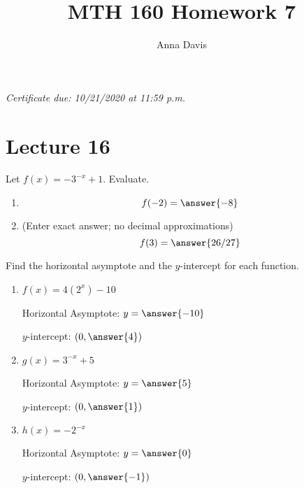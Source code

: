 \documentclass{ximera}
\author{Anna Davis} \title{MTH 160 Homework 7}
\begin{document}
\begin{abstract}

\end{abstract}
\maketitle
 \textit{Certificate due: 10/21/2020 at 11:59 p.m.}
 \section{Lecture 16}
 
  \begin{problem}\label{prob:160hom7prob1} 
Let $f(x)=-3^{-x}+1$.  Evaluate.
  \begin{enumerate}
\item
 $$f(-2)=\answer{-8}$$
\item (Enter exact answer; no decimal approximations)
$$f(3)=\answer{26/27}$$
  \end{enumerate}
\end{problem}  
   \begin{problem}\label{prob:160hom7prob2}
 Find the horizontal asymptote and the $y$-intercept for each function.
 \begin{enumerate}
     \item $f(x)=4(2^x)-10$
     
     Horizontal Asymptote: $y=\answer{-10}$
     
     $y$-intercept: $(0, \answer{4})$
     \item $g(x)=3^{-x}+5$
     
     Horizontal Asymptote: $y=\answer{5}$
     
     $y$-intercept: $(0, \answer{1})$
     \item $h(x)=-2^{-x}$
     
     Horizontal Asymptote: $y=\answer{0}$
     
     $y$-intercept: $(0, \answer{-1})$
 \end{enumerate}
   \end{problem}
\end{document}
